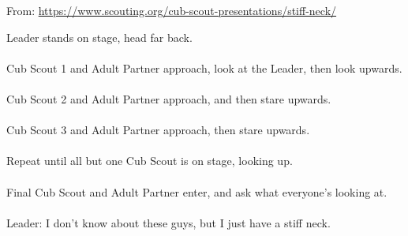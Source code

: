 
From: \url{https://www.scouting.org/cub-scout-presentations/stiff-neck/}

Leader stands on stage, head far back.\\
\\
Cub Scout 1 and Adult Partner approach, look at the Leader, then look upwards.\\
\\
Cub Scout 2 and Adult Partner approach, and then stare upwards.\\
\\
Cub Scout 3 and Adult Partner approach, then stare upwards.\\
\\
Repeat until all but one Cub Scout is on stage, looking up.\\
\\
Final Cub Scout and Adult Partner enter, and ask what everyone’s looking at.\\
\\
Leader: I don’t know about these guys, but I just have a stiff neck.\\
